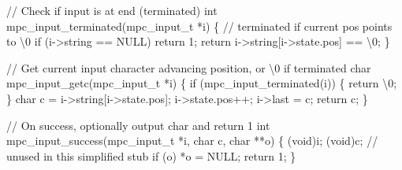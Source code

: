 \documentclass[
  a4paper,
]{scrreprt}
\newenvironment{Shaded}{\begin{snugshade}}{\end{snugshade}}
\newcommand{\CharTok}[1]{\textcolor[rgb]{0.00,0.50,0.00}{#1}}
\newcommand{\CommentTok}[1]{\textcolor[rgb]{0.41,0.41,0.41}{#1}}
\newcommand{\ControlFlowTok}[1]{\textcolor[rgb]{0.85,0.12,0.09}{#1}}
\newcommand{\DataTypeTok}[1]{\textcolor[rgb]{0.47,0.16,0.63}{#1}}
\newcommand{\DecValTok}[1]{\textcolor[rgb]{0.47,0.16,0.63}{#1}}
\newcommand{\NormalTok}[1]{\textcolor[rgb]{0.33,0.33,0.33}{#1}}
\newcommand{\OperatorTok}[1]{\textcolor[rgb]{0.00,0.46,0.62}{#1}}
\newcommand{\SpecialCharTok}[1]{\textcolor[rgb]{0.00,0.46,0.62}{#1}}
\theoremstyle{definition}
\theoremstyle{remark}
\begin{document}
\begin{Shaded}
\begin{Highlighting}[numbers=left,,]
\CommentTok{// Check if input is at end (terminated)}
\DataTypeTok{int}\NormalTok{ mpc\_input\_terminated}\OperatorTok{(}\NormalTok{mpc\_input\_t }\OperatorTok{*}\NormalTok{i}\OperatorTok{)} \OperatorTok{\{}
  \CommentTok{// terminated if current pos points to \textquotesingle{}\textbackslash{}0\textquotesingle{}}
  \ControlFlowTok{if} \OperatorTok{(}\NormalTok{i}\OperatorTok{{-}\textgreater{}}\NormalTok{string }\OperatorTok{==}\NormalTok{ NULL}\OperatorTok{)} \ControlFlowTok{return} \DecValTok{1}\OperatorTok{;}
  \ControlFlowTok{return}\NormalTok{ i}\OperatorTok{{-}\textgreater{}}\NormalTok{string}\OperatorTok{[}\NormalTok{i}\OperatorTok{{-}\textgreater{}}\NormalTok{state}\OperatorTok{.}\NormalTok{pos}\OperatorTok{]} \OperatorTok{==} \CharTok{\textquotesingle{}}\SpecialCharTok{\textbackslash{}0}\CharTok{\textquotesingle{}}\OperatorTok{;}
\OperatorTok{\}}

\CommentTok{// Get current input character advancing position, or \textquotesingle{}\textbackslash{}0\textquotesingle{} if terminated}
\DataTypeTok{char}\NormalTok{ mpc\_input\_getc}\OperatorTok{(}\NormalTok{mpc\_input\_t }\OperatorTok{*}\NormalTok{i}\OperatorTok{)} \OperatorTok{\{}
  \ControlFlowTok{if} \OperatorTok{(}\NormalTok{mpc\_input\_terminated}\OperatorTok{(}\NormalTok{i}\OperatorTok{))} \OperatorTok{\{} \ControlFlowTok{return} \CharTok{\textquotesingle{}}\SpecialCharTok{\textbackslash{}0}\CharTok{\textquotesingle{}}\OperatorTok{;} \OperatorTok{\}}
  \DataTypeTok{char}\NormalTok{ c }\OperatorTok{=}\NormalTok{ i}\OperatorTok{{-}\textgreater{}}\NormalTok{string}\OperatorTok{[}\NormalTok{i}\OperatorTok{{-}\textgreater{}}\NormalTok{state}\OperatorTok{.}\NormalTok{pos}\OperatorTok{];}
\NormalTok{  i}\OperatorTok{{-}\textgreater{}}\NormalTok{state}\OperatorTok{.}\NormalTok{pos}\OperatorTok{++;}
\NormalTok{  i}\OperatorTok{{-}\textgreater{}}\NormalTok{last }\OperatorTok{=}\NormalTok{ c}\OperatorTok{;}
  \ControlFlowTok{return}\NormalTok{ c}\OperatorTok{;}
\OperatorTok{\}}

\CommentTok{// On success, optionally output char and return 1}
\DataTypeTok{int}\NormalTok{ mpc\_input\_success}\OperatorTok{(}\NormalTok{mpc\_input\_t }\OperatorTok{*}\NormalTok{i}\OperatorTok{,} \DataTypeTok{char}\NormalTok{ c}\OperatorTok{,} \DataTypeTok{char} \OperatorTok{**}\NormalTok{o}\OperatorTok{)} \OperatorTok{\{}
  \OperatorTok{(}\DataTypeTok{void}\OperatorTok{)}\NormalTok{i}\OperatorTok{;} \OperatorTok{(}\DataTypeTok{void}\OperatorTok{)}\NormalTok{c}\OperatorTok{;} \CommentTok{// unused in this simplified stub}
  \ControlFlowTok{if} \OperatorTok{(}\NormalTok{o}\OperatorTok{)} \OperatorTok{*}\NormalTok{o }\OperatorTok{=}\NormalTok{ NULL}\OperatorTok{;}
  \ControlFlowTok{return} \DecValTok{1}\OperatorTok{;}
\OperatorTok{\}}


\end{Highlighting}
\end{Shaded}
\end{document}
